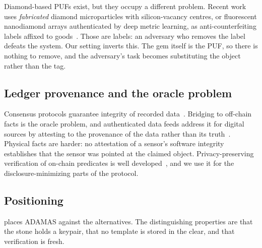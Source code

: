 \documentclass[10pt,twocolumn]{article}
\theoremstyle{remark}
\begin{document}
Diamond-based PUFs exist, but they occupy a different problem. Recent work uses
\emph{fabricated} diamond microparticles with silicon-vacancy centres, or
fluorescent nanodiamond arrays authenticated by deep metric learning, as
anti-counterfeiting labels affixed to goods~\cite{nanodiamond2024,siv_puf2023}.
Those are labels: an adversary who removes the label defeats the system. Our
setting inverts this. The gem itself is the PUF, so there is nothing to remove,
and the adversary's task becomes substituting the object rather than the tag.

\subsection{Ledger provenance and the oracle problem}

Consensus protocols guarantee integrity of recorded
data~\cite{nakamoto2008,buterin2014}. Bridging to off-chain facts is the oracle
problem, and authenticated data feeds address it for digital sources by
attesting to the provenance of the data rather than its
truth~\cite{towncrier2016}. Physical facts are harder: no attestation of a
sensor's software integrity establishes that the sensor was pointed at the
claimed object. Privacy-preserving verification of on-chain predicates is
well developed~\cite{zerocash2014,groth2016}, and we use it for the
disclosure-minimizing parts of the protocol.

\subsection{Positioning}

 places ADAMAS against the alternatives. The distinguishing
properties are that the stone holds a keypair, that no template is stored in the
clear, and that verification is fresh.
\end{document}
